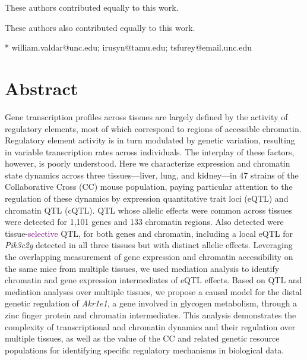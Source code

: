 \documentclass[10pt,letterpaper]{article}
\newcommand{\TFinline}[1]{\textcolor{purple}{#1}}
\begin{document}
\begin{flushleft}
% 
%
\Yinyang These authors contributed equally to this work.

\ddag These authors also contributed equally to this work.




* william.valdar@unc.edu; irusyn@tamu.edu; tsfurey@email.unc.edu

\end{flushleft}
\section*{Abstract}
Gene transcription profiles across tissues are largely defined by the activity of regulatory elements, most of which correspond to regions of accessible chromatin. Regulatory element activity is in turn modulated by genetic variation, resulting in variable transcription rates across individuals. The interplay of these factors, however, is poorly understood. Here we characterize expression and chromatin state dynamics across three tissues---liver, lung, and kidney---in 47 strains of the Collaborative Cross (CC) mouse population, paying particular attention to the regulation of these dynamics by expression quantitative trait loci (eQTL) and chromatin QTL (cQTL). QTL whose allelic effects were common across tissues were detected for 1,101 genes and 133 chromatin regions. Also detected were tissue-\TFinline{selective} QTL, for both genes and chromatin, including a local eQTL for \textit{Pik3c2g} detected in all three tissues but with distinct allelic effects. Leveraging the overlapping measurement of gene expression and chromatin accessibility on the same mice from multiple tissues, we used mediation analysis to identify chromatin and gene expression intermediates of eQTL effects. Based on QTL and mediation analyses over multiple tissues, we propose a causal model for the distal genetic regulation of \textit{Akr1e1}, a gene involved in glycogen metabolism, through a zinc finger protein and chromatin intermediates. This analysis demonstrates the complexity of transcriptional and chromatin dynamics and their regulation over multiple tissues, as well as the value of the CC and related genetic resource populations for identifying specific regulatory mechanisms in biological data.
\end{document}
